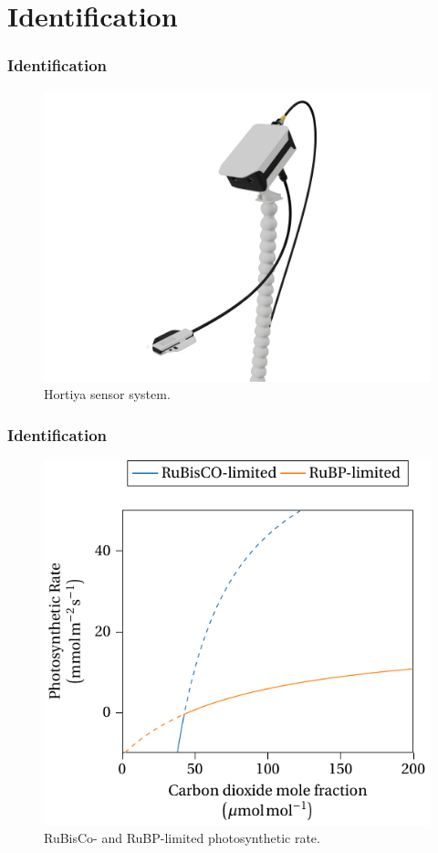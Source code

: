 
\section{Identification}

\begin{frame}
    \frametitle{Identification}
    \begin{figure}
        \centering
        \includegraphics[scale=0.066]{figures/ceres.png}
        \caption{Hortiya sensor system.}
    \end{figure}
\end{frame}

\begin{frame}
    \frametitle{Identification}
    \begin{figure}
        \centering
        \includegraphics[scale=0.5]{figures/photosynthesis.pdf}
        \caption{RuBisCo- and RuBP-limited photosynthetic rate.}
    \end{figure}
\end{frame}

